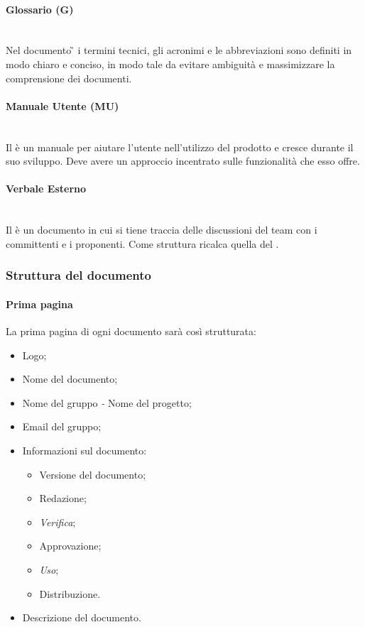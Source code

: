 	\paragraph{Glossario (G)}
	~\\Nel documento \G{} i termini tecnici, gli acronimi e le abbreviazioni sono definiti in modo chiaro e conciso, in modo tale da evitare ambiguità e massimizzare la comprensione dei documenti.
	\paragraph{Manuale Utente (MU)}
	~\\Il \MU{} è un manuale per aiutare l'utente nell'utilizzo del prodotto e cresce durante il suo sviluppo. Deve avere un approccio incentrato sulle funzionalità che esso offre.
	\paragraph{Verbale Esterno}
	~\\Il \VE{} è un documento in cui si tiene traccia delle discussioni del team con i committenti e i proponenti. Come struttura ricalca quella del \VI.
	
	\subsubsection{Struttura del documento}
	\paragraph{Prima pagina}
	La prima pagina di ogni documento sarà così strutturata:
	\begin{itemize}
		\item Logo;
		\item Nome del documento;
		\item Nome del gruppo \emph{-} Nome del progetto;
		\item Email del gruppo;
		\item Informazioni sul documento:
		\begin{itemize}
			\item Versione del documento;
			\item Redazione;
			\item \emph{Verifica};
			\item Approvazione;
			\item \emph{Uso};
			\item Distribuzione.
		\end{itemize}
		\item Descrizione del documento.
	\end{itemize}
